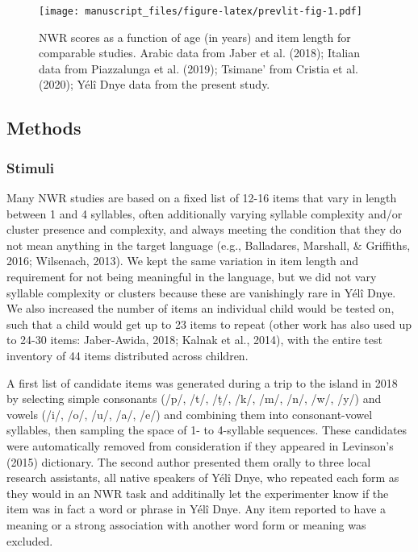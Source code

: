 \documentclass[english,,man,floatsintext]{apa6}
\begin{document}
\begin{figure}
\centering
\texttt{[image: manuscript\_files/figure-latex/prevlit-fig-1.pdf]}
\caption{\label{fig:prevlit-fig}NWR scores as a function of age (in years) and item length for comparable studies. Arabic data from Jaber et al. (2018); Italian data from Piazzalunga et al. (2019); Tsimane' from Cristia et al. (2020); Yélî Dnye data from the present study.}
\end{figure}

\hypertarget{methods}{%
\subsection{Methods}\label{methods}}

\hypertarget{stimuli}{%
\subsubsection{Stimuli}\label{stimuli}}

Many NWR studies are based on a fixed list of 12-16 items that vary in length between 1 and 4 syllables, often additionally varying syllable complexity and/or cluster presence and complexity, and always meeting the condition that they do not mean anything in the target language (e.g., Balladares, Marshall, \& Griffiths, 2016; Wilsenach, 2013). We kept the same variation in item length and requirement for not being meaningful in the language, but we did not vary syllable complexity or clusters because these are vanishingly rare in Yélî Dnye. We also increased the number of items an individual child would be tested on, such that a child would get up to 23 items to repeat (other work has also used up to 24-30 items: Jaber-Awida, 2018; Kalnak et al., 2014), with the entire test inventory of 44 items distributed across children.

A first list of candidate items was generated during a trip to the island in 2018 by selecting simple consonants (/p/, /t/, /ṭ/, /k/, /m/, /n/, /w/, /y/) and vowels (/i/, /o/, /u/, /a/, /e/) and combining them into consonant-vowel syllables, then sampling the space of 1- to 4-syllable sequences. These candidates were automatically removed from consideration if they appeared in Levinson's (2015) dictionary. The second author presented them orally to three local research assistants, all native speakers of Yélî Dnye, who repeated each form as they would in an NWR task and additinally let the experimenter know if the item was in fact a word or phrase in Yélî Dnye. Any item reported to have a meaning or a strong association with another word form or meaning was excluded.
\end{document}
